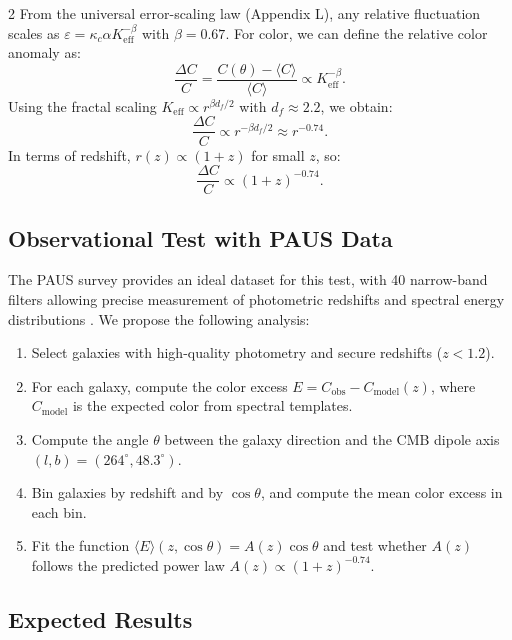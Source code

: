 \documentclass[12pt,a4paper]{article}
\newcommand{\Keff}{K_{\mathrm{eff}}}
\begin{document}
\begin{multicols}{2}
		From the universal error-scaling law (Appendix L), any relative fluctuation scales as \(\varepsilon = \kappa_c \alpha \Keff^{-\beta}\) with \(\beta = 0.67\). For color, we can define the relative color anomaly as:
		\begin{equation}
			\frac{\Delta C}{C} = \frac{C(\theta) - \langle C \rangle}{\langle C \rangle} \propto \Keff^{-\beta}.
		\end{equation}
		Using the fractal scaling \(\Keff \propto r^{\beta d_f/2}\) with \(d_f \approx 2.2\), we obtain:
		\begin{equation}
			\frac{\Delta C}{C} \propto r^{-\beta d_f/2} \approx r^{-0.74}.
		\end{equation}
		In terms of redshift, \(r(z) \propto (1+z)\) for small \(z\), so:
		\begin{equation}
			\frac{\Delta C}{C} \propto (1+z)^{-0.74}.
		\end{equation}
		
		\subsection{Observational Test with PAUS Data}
		
		The PAUS survey provides an ideal dataset for this test, with 40 narrow-band filters allowing precise measurement of photometric redshifts and spectral energy distributions \cite{Alarcon2019}. We propose the following analysis:
		
		\begin{enumerate}
			\item Select galaxies with high-quality photometry and secure redshifts (\(z < 1.2\)).
			\item For each galaxy, compute the color excess \(E = C_{\mathrm{obs}} - C_{\mathrm{model}}(z)\), where \(C_{\mathrm{model}}\) is the expected color from spectral templates.
			\item Compute the angle \(\theta\) between the galaxy direction and the CMB dipole axis \((l,b) = (264^\circ, 48.3^\circ)\).
			\item Bin galaxies by redshift and by \(\cos\theta\), and compute the mean color excess in each bin.
			\item Fit the function \(\langle E \rangle(z,\cos\theta) = A(z) \cos\theta\) and test whether \(A(z)\) follows the predicted power law \(A(z) \propto (1+z)^{-0.74}\).
		\end{enumerate}
		
		\subsection{Expected Results}
		

\end{multicols}
\end{document}
